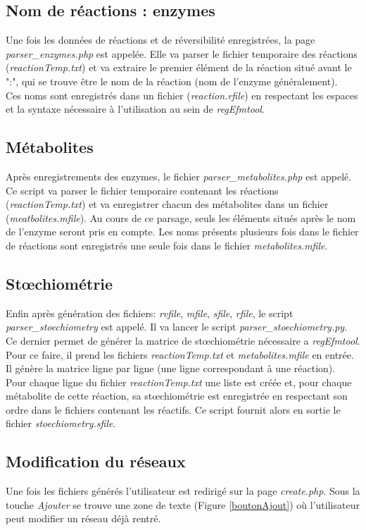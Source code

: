 \subsection{Nom de réactions : enzymes}
Une fois les données de réactions et de réversibilité enregistrées, la page \emph{parser\_enzymes.php} est appelée. Elle va parser le fichier temporaire des réactions (\emph{reactionTemp.txt}) et va extraire le premier élément de la réaction situé avant le ":", qui se trouve être le nom de la réaction (nom de l'enzyme généralement).\\
Ces noms sont enregistrés dans un fichier (\emph{reaction.rfile}) en respectant les espaces et la syntaxe nécessaire à l'utilisation au sein de \emph{regEfmtool}.

\subsection{Métabolites}
Après enregistrements des enzymes, le fichier \emph{parser\_metabolites.php} est appelé. Ce script va parser le fichier temporaire contenant les réactions (\emph{reactionTemp.txt}) et va enregistrer chacun des métabolites dans un fichier (\emph{meatbolites.mfile}). Au cours de ce parsage, seuls les éléments situés après le nom de l'enzyme seront pris en compte. Les noms présents plusieurs fois dans le fichier de réactions sont enregistrés une seule fois dans le fichier \emph{metabolites.mfile}.

\subsection{Stœchiométrie}
Enfin après génération des fichiers: \emph{rvfile}, \emph{mfile}, \emph{sfile}, \emph{rfile}, le script \emph{parser\_stoechiometry} est appelé. Il va lancer le script \emph{parser\_stoechiometry.py}. Ce dernier permet de générer la matrice de stœchiométrie nécessaire a \emph{regEfmtool}. Pour ce faire, il prend les fichiers \emph{reactionTemp.txt} et \emph{metabolites.mfile} en entrée. Il génère la matrice ligne par ligne (une ligne correspondant à une réaction). \\
Pour chaque ligne du fichier \emph{reactionTemp.txt} une liste est créée et, pour chaque métabolite de cette réaction, sa stœchiométrie est enregistrée en respectant son ordre dans le fichiers contenant les réactifs. Ce script fournit alors en sortie le fichier \emph{stoechiometry.sfile}.

\subsection{Modification du réseaux}
Une fois les fichiers générés l'utilisateur est redirigé sur la page \emph{create.php}.
Sous la touche \emph{Ajouter} se trouve une zone de texte (Figure \ref{boutonAjout}) où l'utilisateur peut modifier un réseau déjà rentré. 

